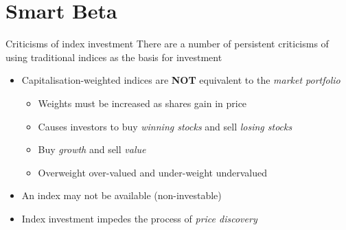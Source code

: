 \documentclass[14pt,xcolor=pdftex,dvipsnames,table]{beamer}\usepackage[]{graphicx}\usepackage[]{color}
\begin{document}
%



\section{Smart Beta}
\begin{frame}{Criticisms of index investment}
There are a number of persistent criticisms of using traditional indices as the basis for investment
\begin{itemize}[<+-| alert@+>]
\pause
\item Capitalisation-weighted indices are \textbf{NOT} equivalent to the \emph{market portfolio}
\begin{itemize}
\item Weights must be increased as shares gain in price
\item Causes investors to buy \emph{winning stocks} and sell \emph{losing stocks}
\item Buy \emph{growth} and sell \emph{value}
\item Overweight over-valued and under-weight undervalued
\end{itemize}
\item An index may not be available (non-investable)
\item Index investment impedes the process of \emph{price discovery} 
\end{itemize}
\end{frame}
\end{document}
